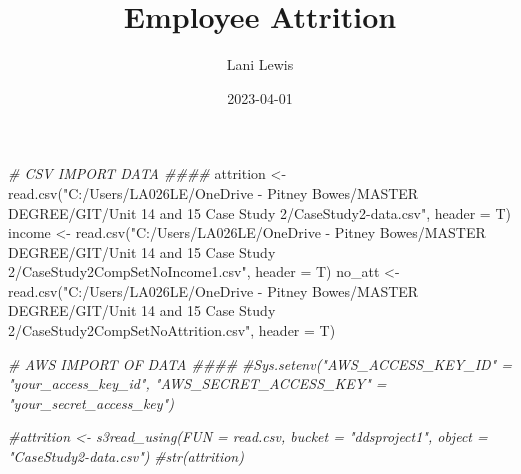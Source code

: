 \documentclass[
]{article}
\title{Employee Attrition}
\author{Lani Lewis}
\date{2023-04-01}
\newenvironment{Shaded}{\begin{snugshade}}{\end{snugshade}}
\newcommand{\AttributeTok}[1]{\textcolor[rgb]{0.77,0.63,0.00}{#1}}
\newcommand{\CommentTok}[1]{\textcolor[rgb]{0.56,0.35,0.01}{\textit{#1}}}
\newcommand{\DocumentationTok}[1]{\textcolor[rgb]{0.56,0.35,0.01}{\textbf{\textit{#1}}}}
\newcommand{\FunctionTok}[1]{\textcolor[rgb]{0.00,0.00,0.00}{#1}}
\newcommand{\NormalTok}[1]{#1}
\newcommand{\OtherTok}[1]{\textcolor[rgb]{0.56,0.35,0.01}{#1}}
\newcommand{\SpecialCharTok}[1]{\textcolor[rgb]{0.00,0.00,0.00}{#1}}
\newcommand{\StringTok}[1]{\textcolor[rgb]{0.31,0.60,0.02}{#1}}
\begin{document}
\maketitle

\begin{Shaded}
\begin{Highlighting}[]
\CommentTok{\# CSV IMPORT DATA \#\#\#\#}
\NormalTok{attrition }\OtherTok{\textless{}{-}} \FunctionTok{read.csv}\NormalTok{(}\StringTok{"C:/Users/LA026LE/OneDrive {-} Pitney Bowes/MASTER DEGREE/GIT/Unit 14 and 15 Case Study 2/CaseStudy2{-}data.csv"}\NormalTok{, }\AttributeTok{header =}\NormalTok{ T)}
\NormalTok{income }\OtherTok{\textless{}{-}} \FunctionTok{read.csv}\NormalTok{(}\StringTok{"C:/Users/LA026LE/OneDrive {-} Pitney Bowes/MASTER DEGREE/GIT/Unit 14 and 15 Case Study 2/CaseStudy2CompSetNoIncome1.csv"}\NormalTok{, }\AttributeTok{header =}\NormalTok{ T)}
\NormalTok{no\_att }\OtherTok{\textless{}{-}} \FunctionTok{read.csv}\NormalTok{(}\StringTok{"C:/Users/LA026LE/OneDrive {-} Pitney Bowes/MASTER DEGREE/GIT/Unit 14 and 15 Case Study 2/CaseStudy2CompSetNoAttrition.csv"}\NormalTok{, }\AttributeTok{header =}\NormalTok{ T)}
\end{Highlighting}
\end{Shaded}

\begin{Shaded}
\begin{Highlighting}[]
\CommentTok{\# AWS IMPORT OF DATA \#\#\#\#}
\CommentTok{\#Sys.setenv("AWS\_ACCESS\_KEY\_ID" = "your\_access\_key\_id",           "AWS\_SECRET\_ACCESS\_KEY" = "your\_secret\_access\_key")}

\CommentTok{\#attrition \textless{}{-} s3read\_using(FUN = read.csv,                          bucket = "ddsproject1",                           object = "CaseStudy2{-}data.csv") }
\CommentTok{\#str(attrition)}
\end{Highlighting}
\end{Shaded}

\begin{Shaded}
\end{Shaded}
\end{document}
